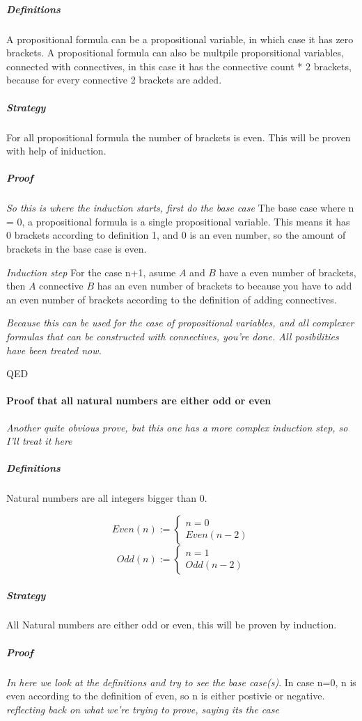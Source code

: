 \documentclass{article}
\begin{document}
\subparagraph{Definitions}
A propositional formula can be a propositional variable,
in which case it has zero brackets.
A propositional formula can also be multpile proporsitional variables,
connected with connectives, in this case it has the connective count * 2
brackets, because for every connective 2 brackets are added.

\subparagraph{Strategy}
For all propositional formula the number of brackets is even.
This will be proven with help of iniduction.

\subparagraph{Proof}
\emph{So this is where the induction starts, first do the base case}
The base case where n = 0,
a propositional formula is a single propositional variable. This means
it has 0 brackets according to definition 1, and 0 is an even number, so
the amount of brackets in the base case is even.

\emph{Induction step}
For the case n+1, asume $A$ and $B$ have a even number of brackets,
then $A$ connective $B$ has an even number of brackets to because you have
to add an even number of brackets according to the definition of adding
connectives.

\emph{Because this can be used for the case of propositional variables,
and all complexer formulas that can be constructed with connectives, you're
done. All posibilities have been treated now.}

QED


\paragraph{Proof that all natural numbers are either odd or even}
\emph{Another quite obvious prove, but this one has a more complex induction
step, so I'll treat it here}

\subparagraph{Definitions}
Natural numbers are all integers bigger than 0.

\[
Even(n) := \left\{
	\begin{array}{l}
		n= 0 \\
		Even(n-2)
	\end{array}
\right.
\]
\[
Odd(n) := \left\{
	\begin{array}{l}
		n= 1 \\
		Odd(n-2)
	\end{array}
\right.
\]

\subparagraph{Strategy}
All Natural numbers are either odd or even, this will be proven by induction.

\subparagraph{Proof} \emph{In here we look at the definitions and try to see
the base case(s)}. In case n=0, n is even according to the definition of
even, so n is either postivie or negative. \emph{reflecting back on what
we're trying to prove, saying its the case}
\end{document}
